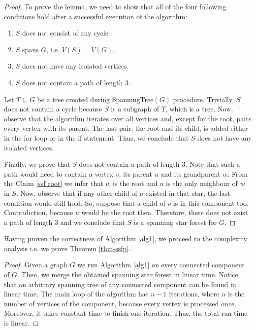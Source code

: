 \documentclass[en]{pracamgr}
\theoremstyle{definition}
\newcommand{\ssf}{spanning star forest}
\begin{document}
\begin{proof}
	To prove the lemma, we need to show that all of the four following conditions hold after a successful execution of the algorithm:
	\begin{enumerate}
		\item $S$ does not consist of any cycle.
		\item $S$ spans $G$, i.e. $V(S) = V(G)$.
		\item $S$ does not have any isolated vertices.
		\item $S$ does not contain a path of length $3$.
	\end{enumerate}
	Let $T \subseteq G$ be a tree created during \textrm{SpanningTree}$(G)$ procedure. Trivially, $S$ does not contain a cycle because $S$ is a subgraph of $T$, which is a tree. Now, observe that the algorithm iterates over all vertices and, except for the root, pairs every vertex with its parent. The last pair, the root and its child, is added either in the for loop or in the if statement. Thus, we conclude that $S$ does not have any isolated vertices. 
	
	Finally, we prove that $S$ does not contain a path of length $3$. Note that such a path would need to contain a vertex $v$, its parent $u$ and its grandparent $w$. From the Claim \ref{ssf root} we infer that $w$ is the root and $u$ is the only neighbour of $w$ in $S$. Now, observe that if any other child of $u$ existed in that star, the last condition would still hold. So, suppose that a child of $v$ is in this component too. Contradiction, because $u$ would be the root then.
	Therefore, there does not exist a path of length $3$ and we conclude that $S$ is a spanning star forest for $G$. 
\end{proof}

Having proven the correctness of Algorithm \ref{alg1}, we proceed to the complexity analysis i.e. we prove Theorem \ref{thm-ssfp}.

\thmssfp*

\begin{proof}
	Given a graph $G$ we run Algorithm \ref{alg1} on every connected component of $G$. Then, we  merge the obtained \ssf{} in linear time. Notice that an arbitrary spanning tree of any connected component can be found in linear time. The main loop of the algorithm has $n-1$ iterations, where $n$ is the number of vertices of the component, because every vertex is processed once. Moreover, it takes constant time to finish one iteration. Thus, the total run time is linear.
\end{proof}
\end{document}
